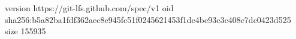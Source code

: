 version https://git-lfs.github.com/spec/v1
oid sha256:b5a82ba1fdf362aec8e945fc51f0245621453f1dc4be93c3c408c7dc0423d525
size 155935
